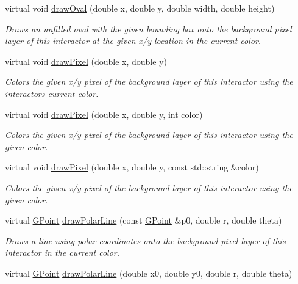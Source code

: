 \begin{DoxyCompactItemize}
virtual void \mbox{\hyperlink{classGDrawingSurface_aa5b1cf902e578907da3c63060686354e}{draw\+Oval}} (double x, double y, double width, double height)
\begin{DoxyCompactList}\small\item\em Draws an unfilled oval with the given bounding box onto the background pixel layer of this interactor at the given x/y location in the current color. \end{DoxyCompactList}\item 
virtual void \mbox{\hyperlink{classGDrawingSurface_a0c1e2923d8d163d62d0896d8c5cfa191}{draw\+Pixel}} (double x, double y)
\begin{DoxyCompactList}\small\item\em Colors the given x/y pixel of the background layer of this interactor using the interactor\textquotesingle{}s current color. \end{DoxyCompactList}\item 
virtual void \mbox{\hyperlink{classGDrawingSurface_a3a64eb6383e601be8438e9c71643c432}{draw\+Pixel}} (double x, double y, int color)
\begin{DoxyCompactList}\small\item\em Colors the given x/y pixel of the background layer of this interactor using the given color. \end{DoxyCompactList}\item 
virtual void \mbox{\hyperlink{classGDrawingSurface_a20abc26a94b7eb310e34abf668e0f5f4}{draw\+Pixel}} (double x, double y, const std\+::string \&color)
\begin{DoxyCompactList}\small\item\em Colors the given x/y pixel of the background layer of this interactor using the given color. \end{DoxyCompactList}\item 
virtual \mbox{\hyperlink{classGPoint}{G\+Point}} \mbox{\hyperlink{classGDrawingSurface_af70cce1e4f708f1ed5b6f29cecb660e7}{draw\+Polar\+Line}} (const \mbox{\hyperlink{classGPoint}{G\+Point}} \&p0, double r, double theta)
\begin{DoxyCompactList}\small\item\em Draws a line using polar coordinates onto the background pixel layer of this interactor in the current color. \end{DoxyCompactList}\item 
virtual \mbox{\hyperlink{classGPoint}{G\+Point}} \mbox{\hyperlink{classGDrawingSurface_ad3e646f90005295f2bbdf37d2bcb39d2}{draw\+Polar\+Line}} (double x0, double y0, double r, double theta)

\end{DoxyCompactItemize}
